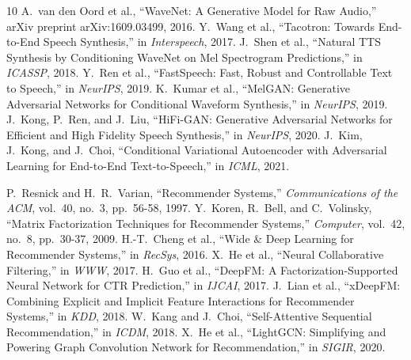 \documentclass{article}
\begin{document}
\begin{thebibliography}{10}
 A.~van den Oord et al., ``WaveNet: A Generative Model for Raw Audio,'' arXiv preprint arXiv:1609.03499, 2016.
 Y.~Wang et al., ``Tacotron: Towards End-to-End Speech Synthesis,'' in \textit{Interspeech}, 2017.
 J.~Shen et al., ``Natural TTS Synthesis by Conditioning WaveNet on Mel Spectrogram Predictions,'' in \textit{ICASSP}, 2018.
 Y.~Ren et al., ``FastSpeech: Fast, Robust and Controllable Text to Speech,'' in \textit{NeurIPS}, 2019.
 K.~Kumar et al., ``MelGAN: Generative Adversarial Networks for Conditional Waveform Synthesis,'' in \textit{NeurIPS}, 2019.
 J.~Kong, P.~Ren, and J.~Liu, ``HiFi-GAN: Generative Adversarial Networks for Efficient and High Fidelity Speech Synthesis,'' in \textit{NeurIPS}, 2020.
 J.~Kim, J.~Kong, and J.~Choi, ``Conditional Variational Autoencoder with Adversarial Learning for End-to-End Text-to-Speech,'' in \textit{ICML}, 2021.

 P.~Resnick and H.~R.~Varian, ``Recommender Systems,'' \textit{Communications of the ACM}, vol.~40, no.~3, pp.~56-58, 1997.
 Y.~Koren, R.~Bell, and C.~Volinsky, ``Matrix Factorization Techniques for Recommender Systems,'' \textit{Computer}, vol.~42, no.~8, pp.~30-37, 2009.
 H.-T.~Cheng et al., ``Wide \& Deep Learning for Recommender Systems,'' in \textit{RecSys}, 2016.
 X.~He et al., ``Neural Collaborative Filtering,'' in \textit{WWW}, 2017.
 H.~Guo et al., ``DeepFM: A Factorization-Supported Neural Network for CTR Prediction,'' in \textit{IJCAI}, 2017.
 J.~Lian et al., ``xDeepFM: Combining Explicit and Implicit Feature Interactions for Recommender Systems,'' in \textit{KDD}, 2018.
 W.~Kang and J.~Choi, ``Self-Attentive Sequential Recommendation,'' in \textit{ICDM}, 2018.
 X.~He et al., ``LightGCN: Simplifying and Powering Graph Convolution Network for Recommendation,'' in \textit{SIGIR}, 2020.


\end{thebibliography}
\end{document}
